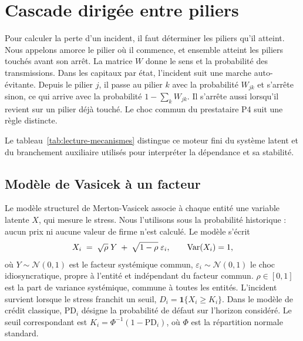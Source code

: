 ﻿%

\chapter{Cascade dirigée entre piliers}
\label{chap:cascade}

Pour calculer la perte d'un incident, il faut déterminer les piliers qu'il atteint.
Nous appelons amorce le pilier où il commence, et ensemble atteint les piliers touchés avant son arrêt.
La matrice $W$ donne le sens et la probabilité des transmissions. Dans les capitaux par état,
l'incident suit une marche auto-évitante. Depuis le pilier $j$, il passe au pilier $k$ avec la
probabilité $W_{jk}$ et s'arrête sinon, ce qui arrive avec la probabilité $1-\sum_k W_{jk}$. Il s'arrête
aussi lorsqu'il revient sur un pilier déjà touché. Le choc commun du prestataire P4 suit une règle distincte.

Le tableau~\ref{tab:lecture-mecanismes} distingue ce moteur fini du système latent et du
branchement auxiliaire utilisés pour interpréter la dépendance et sa stabilité.





\section{Modèle de Vasicek à un facteur}

Le modèle structurel de Merton-Vasicek associe à chaque entité une variable latente $X$, qui
mesure le stress. Nous l'utilisons sous la probabilité historique : aucun prix ni aucune valeur de
firme n'est calculé. Le modèle s'écrit
\begin{equation}
X_i \;=\; \sqrt{\rho}\;Y \;+\; \sqrt{1-\rho}\;\varepsilon_i, \qquad \mathrm{Var}(X_i)=1,
\end{equation}
où $Y\sim\mathcal N(0,1)$ est le facteur systémique commun, $\varepsilon_i\sim\mathcal N(0,1)$ le
choc idiosyncratique, propre à l'entité et indépendant du facteur commun. $\rho\in[0,1]$ est la part de variance systémique, commune à toutes les entités.
L'incident survient lorsque le stress franchit un seuil, $D_i=\mathbf 1\{X_i\ge K_i\}$.
Dans le modèle de crédit classique, $\mathrm{PD}_i$ désigne la probabilité de défaut sur l'horizon
considéré. Le seuil correspondant est $K_i=\Phi^{-1}(1-\mathrm{PD}_i)$, où $\Phi$ est la répartition normale standard.

